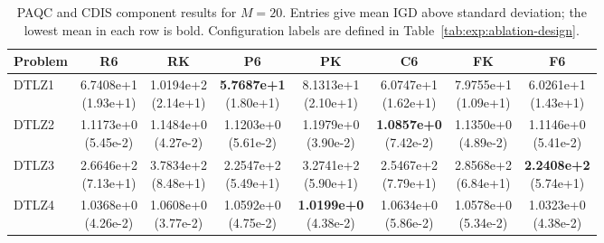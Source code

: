 \begin{table}[p]
\centering
\caption{PAQC and CDIS component results for $M=20$. Entries give mean IGD above standard deviation; the lowest mean in each row is bold. Configuration labels are defined in Table~\ref{tab:exp:ablation-design}.}
\label{tab:exp:abl20}
\footnotesize
\setlength{\tabcolsep}{5pt}
\renewcommand{\arraystretch}{1.12}
\begin{tabular}{lccccccc}
\toprule
Problem & R6 & RK & P6 & PK & C6 & FK & F6 \\
\midrule
DTLZ1 & \shortstack{6.7408e+1\\(1.93e+1)} & \shortstack{1.0194e+2\\(2.14e+1)} & \shortstack{\textbf{5.7687e+1}\\(1.80e+1)} & \shortstack{8.1313e+1\\(2.10e+1)} & \shortstack{6.0747e+1\\(1.62e+1)} & \shortstack{7.9755e+1\\(1.09e+1)} & \shortstack{6.0261e+1\\(1.43e+1)} \\
DTLZ2 & \shortstack{1.1173e+0\\(5.45e-2)} & \shortstack{1.1484e+0\\(4.27e-2)} & \shortstack{1.1203e+0\\(5.61e-2)} & \shortstack{1.1979e+0\\(3.90e-2)} & \shortstack{\textbf{1.0857e+0}\\(7.42e-2)} & \shortstack{1.1350e+0\\(4.89e-2)} & \shortstack{1.1146e+0\\(5.41e-2)} \\
DTLZ3 & \shortstack{2.6646e+2\\(7.13e+1)} & \shortstack{3.7834e+2\\(8.48e+1)} & \shortstack{2.2547e+2\\(5.49e+1)} & \shortstack{3.2741e+2\\(5.90e+1)} & \shortstack{2.5467e+2\\(7.79e+1)} & \shortstack{2.8568e+2\\(6.84e+1)} & \shortstack{\textbf{2.2408e+2}\\(5.74e+1)} \\
DTLZ4 & \shortstack{1.0368e+0\\(4.26e-2)} & \shortstack{1.0608e+0\\(3.77e-2)} & \shortstack{1.0592e+0\\(4.75e-2)} & \shortstack{\textbf{1.0199e+0}\\(4.38e-2)} & \shortstack{1.0634e+0\\(5.86e-2)} & \shortstack{1.0578e+0\\(5.34e-2)} & \shortstack{1.0323e+0\\(4.38e-2)} \\

\end{tabular}
\end{table}
